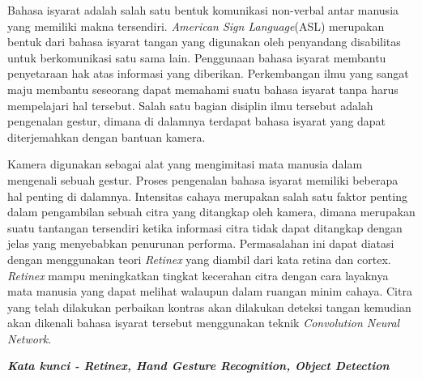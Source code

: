 \documentclass{tesisilkomugm}
\begin{document}
\begin{abstractind}
Bahasa isyarat adalah salah satu bentuk komunikasi non-verbal antar manusia yang memiliki makna tersendiri. \emph{American Sign Language}(ASL) merupakan bentuk dari bahasa isyarat tangan yang digunakan oleh penyandang disabilitas untuk berkomunikasi satu sama lain. Penggunaan bahasa isyarat membantu penyetaraan hak atas informasi yang diberikan. Perkembangan ilmu yang sangat maju membantu seseorang dapat memahami suatu bahasa isyarat tanpa harus mempelajari hal tersebut. Salah satu bagian disiplin ilmu tersebut adalah pengenalan gestur, dimana di dalamnya terdapat bahasa isyarat yang dapat diterjemahkan dengan bantuan kamera.

Kamera digunakan sebagai alat yang mengimitasi mata manusia dalam mengenali sebuah gestur. Proses pengenalan bahasa isyarat memiliki beberapa hal penting di dalamnya. Intensitas cahaya merupakan salah satu faktor penting dalam pengambilan sebuah citra yang ditangkap oleh kamera, dimana merupakan suatu tantangan tersendiri ketika informasi citra tidak dapat ditangkap dengan jelas yang menyebabkan penurunan performa. Permasalahan ini dapat diatasi dengan menggunakan teori \emph{Retinex} yang diambil dari kata retina dan cortex. \emph{Retinex} mampu meningkatkan tingkat kecerahan citra dengan cara layaknya mata manusia yang dapat melihat walaupun dalam ruangan minim cahaya. Citra yang telah dilakukan perbaikan kontras akan dilakukan deteksi tangan kemudian akan dikenali bahasa isyarat tersebut menggunakan teknik \emph{Convolution Neural Network}.

\textbf{\emph{Kata kunci - Retinex, Hand Gesture Recognition, Object Detection} }
\end{abstractind}

\end{document}
